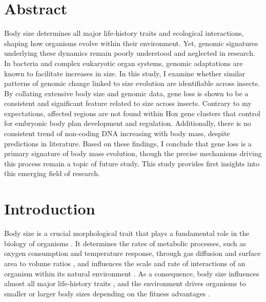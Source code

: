 \documentclass[11pt]{article}
\begin{document}
\section*{Abstract}
Body size determines all major life-history traits and ecological interactions, shaping how organisms evolve within their environment. Yet, genomic signatures underlying these dynamics remain poorly understood and neglected in research. In bacteria and complex eukaryotic organ systems, genomic adaptations are known to facilitate increases in size. In this study, I examine whether similar patterns of genomic change linked to size evolution are identifiable across insects. By collating extensive body size and genomic data, gene loss is shown to be a consistent and significant feature related to size across insects. Contrary to my expectations, affected regions are not found within Hox gene clusters that control for embryonic body plan development and regulation. Additionally, there is no consistent trend of non-coding DNA increasing with body mass, despite predictions in literature. Based on these findings, I conclude that gene loss is a primary signature of body mass evolution, though the precise mechanisms driving this process remain a topic of future study. This study provides first insights into this emerging field of research.
\pagebreak

\tableofcontents
\thispagestyle{empty}
\pagebreak
\setcounter{page}{1}


\linenumbers


\section{Introduction}
Body size is a crucial morphological trait that plays a fundamental role in the biology of organisms \citep{roff1994evolution}. It determines the rates of metabolic processes, such as oxygen consumption and temperature response, through gas diffusion and surface area to volume ratios \citep{gasdiffusion}, and influences the scale and rate of interactions of an organism within its natural environment \citep{Peters_1983, mass-rate, interactions}. As a consequence, body size influences almost all major life-history traits \citep{mass-life-history}, and the environment drives organisms to smaller or larger body sizes depending on the fitness advantages \citep{smallervslarger}. 
\end{document}
